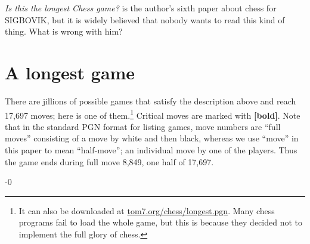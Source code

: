 \documentclass[twocolumn]{article}
\begin{document}
\smallskip
{\it Is this the longest Chess game?} is the author's sixth paper
about chess for SIGBOVIK, but it is widely believed that nobody wants
to read this kind of thing. What is wrong with him?

\section{A longest game} \label{sec:longest}

There are jillions of possible games that satisfy the description
above and reach 17,697 moves; here is one of them.\footnote{
  It can also be downloaded at \url{tom7.org/chess/longest.pgn}.
  Many chess programs fail to load the whole game, but this is
  because they decided not to implement the full glory of chess.}
%
Critical moves are marked with {\large \bf [bold]}. Note that in the
standard PGN format for listing games, move numbers are ``full moves''
consisting of a move by white and then black, whereas we use ``move''
in this paper to mean ``half-move''; an individual move by one of the
players. Thus the game ends during full move 8,849, one half of
17,697.

\medskip

\begin{sloppypar}
\tiny
{}

\noindent 
{}-0

\end{sloppypar}

\nocite{chesstego}

{}

\end{document}
